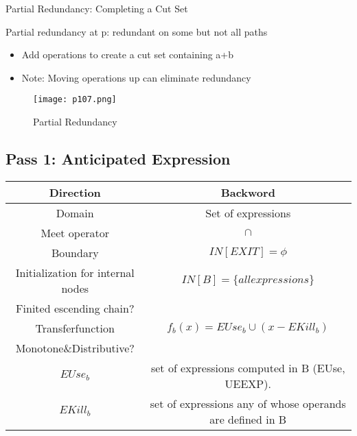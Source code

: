 \begin{definition}{Partial Redundancy: Completing a Cut Set}

	Partial redundancy at p: redundant on some but not all paths

	\begin{itemize}
		\item Add operations to create a cut set containing a+b
		\item Note: Moving operations up can eliminate redundancy
	\end{itemize}

	\begin{figure}[H]
		\centering
		\texttt{[image: p107.png]}
		\caption{Partial Redundancy}
		\label{fig:p107}
	\end{figure}
\end{definition}



\subsection{Pass 1: Anticipated Expression}


\begin{center}
	\begin{tabular}{|c|c|}
		\hline Direction                         & Backword                                                  \\
		\hline Domain                            & Set of expressions                                        \\
		\hline Meet operator                     & \( \cap \)                                                \\
		\hline Boundary                          & $IN[EXIT] = \phi$                                         \\
		\hline Initialization for internal nodes & \( IN[B] = \{ all expressions\} \)                        \\
		\hline Finited escending chain?          & \checkmark                                                \\
		\hline Transferfunction                  & \( f_b(x) = EUse_b \cup (x - EKill_b) \)                  \\
		\hline Monotone\&Distributive?           & \checkmark                                                \\
		\hline \( EUse_b \)                      & set of expressions computed in B (EUse, UEEXP).           \\
		\hline \( EKill_b \)                     & set of expressions any of whose operands are defined in B \\
		\hline
	\end{tabular}
\end{center}



